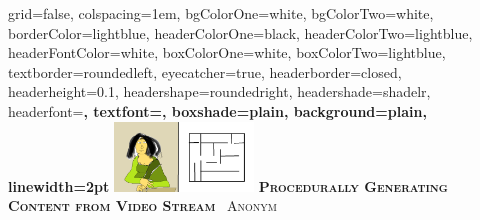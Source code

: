 \documentclass[landscape,final,a0paper,fontscale=0.285]{baposter}
\begin{document}
\begin{poster}%
  {
  grid=false,
  colspacing=1em,
  bgColorOne=white,
  bgColorTwo=white,
  borderColor=lightblue,
  headerColorOne=black,
  headerColorTwo=lightblue,
  headerFontColor=white,
  boxColorOne=white,
  boxColorTwo=lightblue,
  textborder=roundedleft,
  eyecatcher=true,
  headerborder=closed,
  headerheight=0.1\textheight,
  headershape=roundedright,
  headershade=shadelr,
  headerfont=\Large\bf\textsc, %
  textfont={\setlength{\parindent}{1.5em}},
  boxshade=plain,
  background=plain,
  linewidth=2pt
  }
  {\includegraphics[height=5em]{images/eyecatcher}} 
  {\bf\textsc{Procedurally Generating Content from Video Stream}\vspace{0.5em}}
  {\textsc{\ Anonym}}
  {%
  }

    \newcommand{\colouredcircle}{%
      \tikz{\useasboundingbox (-0.2em,-0.32em) rectangle(0.2em,0.32em); \draw[draw=black,fill=lightblue,line width=0.03em] (0,0) circle(0.18em);}}

\end{poster}
\end{document}
